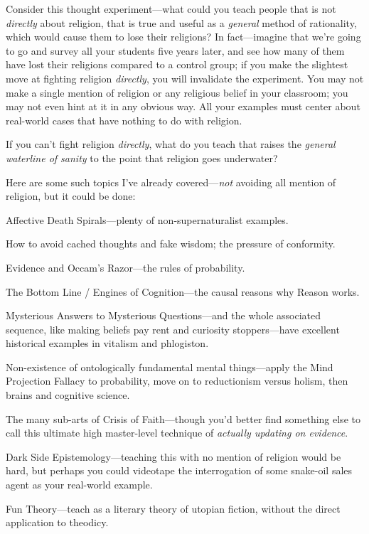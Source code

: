{
 Consider this thought experiment---what could you teach people
that is not \textit{directly} about religion, that is true and useful
as a \textit{general} method of rationality, which would cause them to
lose their religions? In fact---imagine that we're
going to go and survey all your students five years later, and see how
many of them have lost their religions compared to a control group; if
you make the slightest move at fighting religion \textit{directly}, you
will invalidate the experiment. You may not make a single mention of
religion or any religious belief in your classroom; you may not even
hint at it in any obvious way. All your examples must center about
real-world cases that have nothing to do with religion.}

{
 If you can't fight religion \textit{directly},
what do you teach that raises the \textit{general waterline of sanity}
to the point that religion goes underwater?}

{
 Here are some such topics I've already
covered---\textit{not} avoiding all mention of religion, but it could
be done:}

{
 Affective Death Spirals---plenty of non-supernaturalist examples.}

{
 How to avoid cached thoughts and fake wisdom; the pressure of
conformity.}

{
 Evidence and Occam's Razor---the rules of
probability.}

{
 The Bottom Line / Engines of Cognition---the causal reasons why
Reason works.}

{
 Mysterious Answers to Mysterious Questions---and the whole
associated sequence, like making beliefs pay rent and curiosity
stoppers---have excellent historical examples in vitalism and
phlogiston.}

{
 Non-existence of ontologically fundamental mental things---apply
the Mind Projection Fallacy to probability, move on to reductionism
versus holism, then brains and cognitive science.}

{
 The many sub-arts of Crisis of Faith---though
you'd better find something else to call this ultimate
high master-level technique of \textit{actually updating on evidence}.}

{
 Dark Side Epistemology---teaching this with no mention of religion
would be hard, but perhaps you could videotape the interrogation of
some snake-oil sales agent as your real-world example.}

{
 Fun Theory{}---teach as a literary theory of utopian fiction,
without the direct application to theodicy.}

